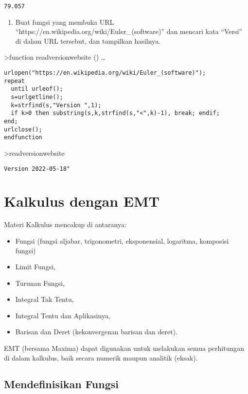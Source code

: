 \documentclass[
]{book}
\providecommand{\tightlist}{%
  \setlength{\itemsep}{0pt}\setlength{\parskip}{0pt}}
\begin{document}
\begin{verbatim}
79.057
\end{verbatim}

\begin{enumerate}
\def\labelenumi{\arabic{enumi}.}
\setcounter{enumi}{3}
\tightlist
\item
  Buat fungsi yang membuka URL ``https://en.wikipedia.org/wiki/Euler\_(software)'' dan mencari kata ``Versi'' di dalam URL tersebut, dan tampilkan hasilnya.
\end{enumerate}

\textgreater function readversionwebsite () \ldots{}

\begin{verbatim}
urlopen("https://en.wikipedia.org/wiki/Euler_(software)");
repeat
  until urleof();
  s=urlgetline();
  k=strfind(s,"Version ",1);
  if k>0 then substring(s,k,strfind(s,"<",k)-1), break; endif;
end;
urlclose();
endfunction
\end{verbatim}

\textgreater readversionwebsite

\begin{verbatim}
Version 2022-05-18"
\end{verbatim}

\chapter{Kalkulus dengan EMT}\label{kalkulus-dengan-emt}

Materi Kalkulus mencakup di antaranya:

\begin{itemize}
\tightlist
\item
  Fungsi (fungsi aljabar, trigonometri, eksponensial, logaritma, komposisi fungsi)
\item
  Limit Fungsi,
\item
  Turunan Fungsi,
\item
  Integral Tak Tentu,
\item
  Integral Tentu dan Aplikasinya,
\item
  Barisan dan Deret (kekonvergenan barisan dan deret).
\end{itemize}

EMT (bersama Maxima) dapat digunakan untuk melakukan semua perhitungan di dalam kalkulus, baik secara numerik maupun analitik (eksak).

\section{Mendefinisikan Fungsi}\label{mendefinisikan-fungsi}
\end{document}
